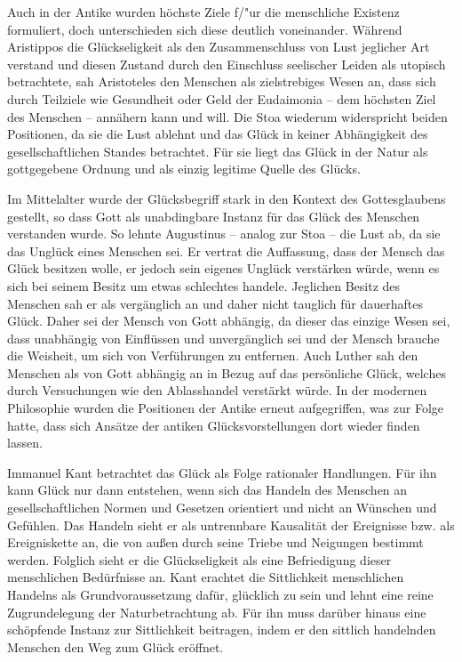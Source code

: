 Auch in der Antike wurden höchste Ziele f/"ur die menschliche Existenz formuliert, doch unterschieden sich diese deutlich voneinander. 
Während Aristippos die Glückseligkeit als den Zusammenschluss von Lust jeglicher Art verstand und diesen Zustand durch den Einschluss seelischer Leiden als utopisch betrachtete, sah Aristoteles den Menschen als zielstrebiges Wesen an, dass sich durch Teilziele wie Gesundheit oder Geld der Eudaimonia -- dem höchsten Ziel des Menschen -- annähern kann und will. 
Die Stoa wiederum widerspricht beiden Positionen, da sie die Lust ablehnt und das Glück in keiner Abhängigkeit des gesellschaftlichen Standes betrachtet. 
Für sie liegt das Glück in der Natur als gottgegebene Ordnung und als einzig legitime Quelle des Glücks.

Im Mittelalter wurde der Glücksbegriff stark in den Kontext des Gottesglaubens gestellt, so dass Gott als unabdingbare Instanz für das Glück des Menschen verstanden wurde. 
So lehnte Augustinus -- analog zur Stoa -- die Lust ab, da sie das Unglück eines Menschen sei. 
Er vertrat die Auffassung, dass der Mensch das Glück besitzen wolle, er jedoch sein eigenes Unglück verstärken würde, wenn es sich bei seinem Besitz um etwas schlechtes handele. 
Jeglichen Besitz des Menschen sah er als vergänglich an und daher nicht tauglich für dauerhaftes Glück. 
Daher sei der Mensch von Gott abhängig, da dieser das einzige Wesen sei, dass unabhängig von Einflüssen und unvergänglich sei und der Mensch brauche die Weisheit, um sich von Verführungen zu entfernen. 
Auch Luther sah den Menschen als von Gott abhängig an in Bezug auf das persönliche Glück, welches durch Versuchungen wie den Ablasshandel verstärkt würde. 
In der modernen Philosophie wurden die Positionen der Antike erneut aufgegriffen, was zur Folge hatte, dass sich Ansätze der antiken Glücksvorstellungen dort wieder finden lassen.
 
Immanuel Kant betrachtet das Glück als Folge rationaler Handlungen. 
Für ihn kann Glück nur dann entstehen, wenn sich das Handeln des Menschen an gesellschaftlichen Normen und Gesetzen orientiert und nicht an Wünschen und Gefühlen. 
Das Handeln sieht er als untrennbare Kausalität der Ereignisse bzw. als Ereigniskette an, die von außen durch seine Triebe und Neigungen bestimmt werden. 
Folglich sieht er die Glückseligkeit als eine Befriedigung dieser menschlichen Bedürfnisse an. 
Kant erachtet die Sittlichkeit menschlichen Handelns als Grundvoraussetzung dafür, glücklich zu sein und lehnt eine reine Zugrundelegung der Naturbetrachtung ab. 
Für ihn muss darüber hinaus eine schöpfende Instanz zur Sittlichkeit beitragen, indem er den sittlich handelnden Menschen den Weg zum Glück eröffnet.

